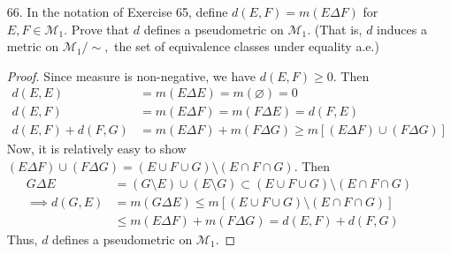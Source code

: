 \documentclass{article}
\begin{document}
\begin{itemize}
	\item[66.] In the notation of Exercise 65, define $d(E, F)=m(E\Delta F)$ for $E, F\in \mathcal M_1.$ Prove that $d$ defines a pseudometric on $\mathcal M_1.$ (That is, $d$ induces a metric on $\mathcal M_1/\sim,$ the set of equivalence classes under equality a.e.)
		\begin{proof}
			Since measure is non-negative, we have $d(E, F)\ge 0.$ Then
			\begin{align*}
				d(E, E) &= m(E\Delta E) = m(\varnothing) = 0 \\
				d(E, F) &= m(E\Delta F) = m(F\Delta E) = d(F, E) \\
				d(E, F) + d(F, G) &= m(E\Delta F) + m(F\Delta G) \ge m\left[ (E\Delta F) \cup (F\Delta G) \right]
			\end{align*}
			Now, it is relatively easy to show $(E\Delta F)\cup (F\Delta G) = (E\cup F\cup G)\setminus(E\cap F\cap G).$ Then 
			\begin{align*}
				G\Delta E &= (G\setminus E)\cup (E\setminus G) \subset (E\cup F\cup G)\setminus (E\cap F\cap G) \\
				\implies d(G, E) &= m(G\Delta E) \le m\left[ (E\cup F\cup G)\setminus (E\cap F\cap G) \right] \\
				&\le m(E\Delta F) + m(F\Delta G) = d(E, F) + d(F, G)
			\end{align*}
			Thus, $d$ defines a pseudometric on $\mathcal M_1.$
		\end{proof}

\end{itemize}
\end{document}
